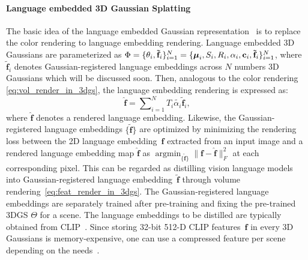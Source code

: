 \paragraph{Language embedded 3D Gaussian Splatting}
The basic idea of the language embedded Gaussian representation~\cite{langsplat, legaussian, zhou2024feature, semantic_gaussians, fastlgs, fmgs, gaussian_grasper, rethinking_open_vocab} is to replace the color rendering to language embedding rendering. 
Language embedded 3D Gaussians are parameterized as $\Phi = \{ \theta_i, \mathbf{\tilde f}_i \}_{i=1}^N = \{ \mbox{\boldmath $\mu$}_i, S_i, R_i, \alpha_i, \mathbf{c}_i, \mathbf{\tilde f}_i \}_{i=1}^N$, where $\mathbf{\tilde f}_i$ denotes Gaussian-registered language embeddings across $N$ numbers 3D Gaussians which will be discussed soon. Then, analogous to the color rendering \cref{eq:vol_render_in_3dgs}, the language embedding rendering is expressed as:
\begin{equation}
\label{eq:feat_render_in_3dgs}
    \mathbf{\hat f} = \sum\nolimits_{i=1}^{N} T_i\tilde{\alpha_i}\mathbf{\tilde f}_i, 
\end{equation}
where $\mathbf{\hat f}$ denotes a rendered language embedding.
Likewise, the Gaussian-registered language embeddings $\{\mathbf{\tilde f}\}$ are optimized by minimizing the rendering loss between the 2D language embedding~$\mathbf{f}$ extracted from an input image and a rendered language embedding map $\hat{\mathbf{f}} $ as $\mathop{\arg\min}_{\{\mathbf{\tilde f}\}} \| \mathbf{{f}} - \mathbf{\hat{f}} \|_F^2$ at each corresponding pixel. 
This can be regarded as distilling vision language models into Gaussian-registered language embedding~$\mathbf{\tilde{f}}$ through volume rendering~\cref{eq:feat_render_in_3dgs}.
The Gaussian-registered language embeddings are separately trained after pre-training and fixing the pre-trained 3DGS $\Theta$ for a scene.
The language embeddings to be distilled are typically obtained from CLIP~\cite{clip}.
Since storing 32-bit 512-D CLIP features~$\mathbf{f}$ in every 3D Gaussians is memory-expensive, one can use a compressed feature per scene depending on the needs~\cite{fastlgs,legaussian, zhou2024feature,fmgs, gaussian_grasper}.

